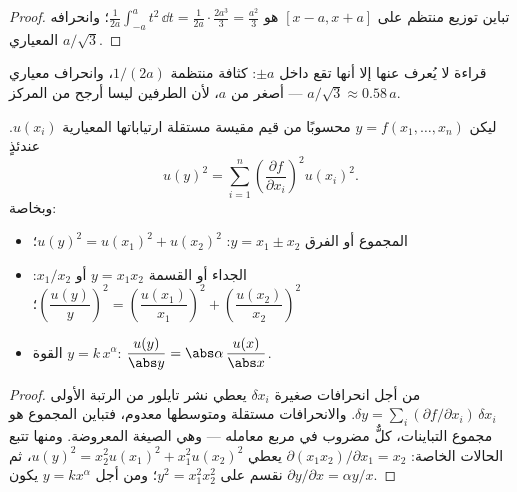 \begin{proof}
تباين توزيع منتظم على $[x - a, x + a]$ هو
$\frac{1}{2a}\int_{-a}^{a} t^2\,\dd t = \frac{1}{2a}\cdot\frac{2a^3}{3}
= \frac{a^2}{3}$؛ وانحرافه المعياري $a/\sqrt3$.
\end{proof}

\begin{omfigure}

{\small قراءة لا يُعرف عنها إلا أنها تقع داخل $\pm a$: كثافة منتظمة
$1/(2a)$، وانحراف معياري $a/\sqrt3 \approx 0.58\,a$ --- أصغر من
$a$، لأن الطرفين ليسا أرجح من المركز.}
\end{omfigure}

\begin{theorem}\label{thm:b1:units-dimensions:propagation}
ليكن $y = f(x_1, \dots, x_n)$ محسوبًا من قيم مقيسة مستقلة ارتياباتها
المعيارية $u(x_i)$. عندئذٍ
\[
u(y)^2 = \sum_{i=1}^n \left(\frac{\partial f}{\partial x_i}\right)^2 u(x_i)^2 .
\]
وبخاصة:
\begin{itemize}
  \item المجموع أو الفرق $y = x_1 \pm x_2$:
        $u(y)^2 = u(x_1)^2 + u(x_2)^2$؛
  \item الجداء أو القسمة $y = x_1 x_2$ أو $x_1/x_2$:
        $\left(\dfrac{u(y)}{y}\right)^2 = \left(\dfrac{u(x_1)}{x_1}\right)^2
        + \left(\dfrac{u(x_2)}{x_2}\right)^2$؛
  \item القوة $y = k\,x^\alpha$: $\dfrac{u(y)}{\abs y} = \abs\alpha\,\dfrac{u(x)}{\abs x}$.
\end{itemize}
\end{theorem}

\begin{proof}
من أجل انحرافات صغيرة $\delta x_i$ يعطي نشر تايلور من الرتبة الأولى
$\delta y = \sum_i (\partial f/\partial x_i)\,\delta x_i$.
والانحرافات مستقلة ومتوسطها معدوم، فتباين المجموع هو مجموع
التباينات، كلٌّ مضروب في مربع معامله --- وهي الصيغة المعروضة. ومنها
تتبع الحالات الخاصة: $\partial(x_1 x_2)/\partial x_1 = x_2$ يعطي
$u(y)^2 = x_2^2 u(x_1)^2 + x_1^2 u(x_2)^2$، ثم نقسم على
$y^2 = x_1^2 x_2^2$؛ ومن أجل $y = kx^\alpha$ يكون
$\partial y/\partial x = \alpha y/x$.
\end{proof}

